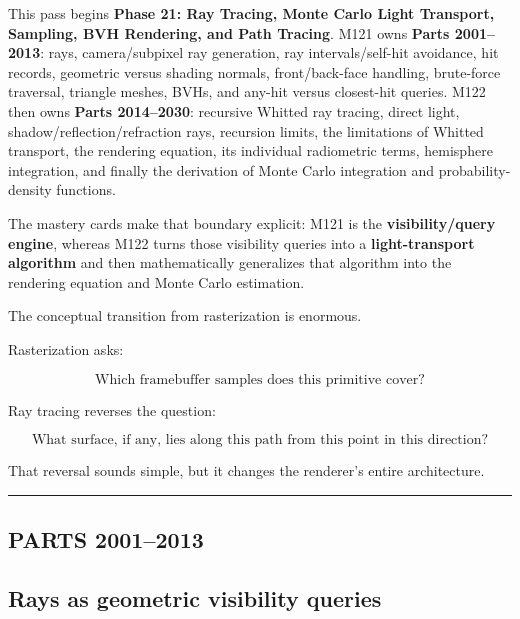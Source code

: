 This pass begins \textbf{Phase 21: Ray Tracing, Monte Carlo Light Transport, Sampling, BVH Rendering, and Path Tracing}. M121 owns \textbf{Parts 2001--2013}: rays, camera/subpixel ray generation, ray intervals/self-hit avoidance, hit records, geometric versus shading normals, front/back-face handling, brute-force traversal, triangle meshes, BVHs, and any-hit versus closest-hit queries. M122 then owns \textbf{Parts 2014--2030}: recursive Whitted ray tracing, direct light, shadow/reflection/refraction rays, recursion limits, the limitations of Whitted transport, the rendering equation, its individual radiometric terms, hemisphere integration, and finally the derivation of Monte Carlo integration and probability-density functions.

The mastery cards make that boundary explicit: M121 is the \textbf{visibility/query engine}, whereas M122 turns those visibility queries into a \textbf{light-transport algorithm} and then mathematically generalizes that algorithm into the rendering equation and Monte Carlo estimation.

The conceptual transition from rasterization is enormous.

Rasterization asks:

\[
\boxed{
\text{Which framebuffer samples does this primitive cover?}
}
\]

Ray tracing reverses the question:

\[
\boxed{
\text{What surface, if any, lies along this path from this point in this direction?}
}
\]

That reversal sounds simple, but it changes the renderer's entire architecture.

\begin{center}\rule{0.5\linewidth}{0.5pt}\end{center}

\subsection{PARTS 2001--2013}\label{04-visual-computing-ii-ch028-parts-20012013}

\hypertarget{04-visual-computing-ii-ch028-parts-20012013}{}

\subsection{Rays as geometric visibility queries}\label{04-visual-computing-ii-ch028-rays-as-geometric-visibility-queries}

